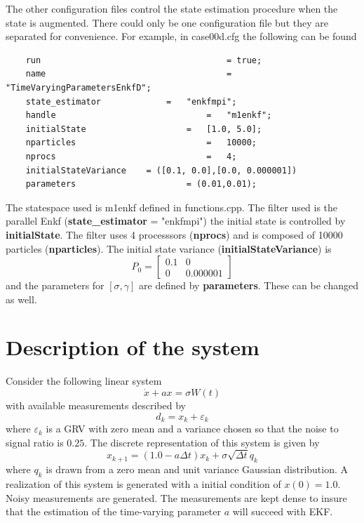 \documentclass[]{elsarticle}
\begin{document}
The other configuration files control the state estimation procedure when the state is augmented. There could only be one configuration file but they are separated for convenience. For example, in case00d.cfg the following can be found
\begin{verbatim}
	run										= true;
	name 									=	"TimeVaryingParametersEnkfD";
	state_estimator				=	"enkfmpi";
	handle 								=	"m1enkf";
	initialState 					=	[1.0, 5.0];
	nparticles							=	10000;
	nprocs								=	4;
	initialStateVariance 	= ([0.1, 0.0],[0.0, 0.000001])
	parameters 						= (0.01,0.01);
\end{verbatim}
The statespace used is m1enkf defined in functions.cpp. The filter used is the parallel Enkf ({\bf state\_estimator} = "enkfmpi") the initial state is controlled by {\bf initialState}. The filter uses 4 processsors ({\bf nprocs}) and is composed of 10000 particles ({\bf nparticles}). The initial state variance ({\bf initialStateVariance}) is 
\begin{equation}
P_0 = \begin{bmatrix}
0.1 & 0 \\
0 & 0.000001
\end{bmatrix}
\end{equation}
and the parameters for $[\sigma, \gamma]$ are defined by {\bf parameters}. These can be changed as well.

\section*{Description of the system}

Consider the following linear system
\begin{equation}
\dot{x} + a x = \sigma W(t)
\end{equation}
with available measurements described by
\begin{equation}
d_k = x_k + \varepsilon_k
\end{equation}
where $\varepsilon_k$ is a GRV with zero mean and a variance chosen so that the noise to signal ratio is $0.25$. The discrete representation of this system is given by
\begin{equation}
x_{k+1} = (1.0 - a \Delta t) x_k + \sigma \sqrt{\Delta t} q_k
\end{equation}
where $q_k$ is drawn from a zero mean and unit variance Gaussian distribution. A realization of this system is generated with a initial condition of $x(0) = 1.0$. Noisy measurements are generated. The measurements are kept dense to insure that the estimation of the time-varying parameter $a$ will succeed with EKF.
\end{document}
